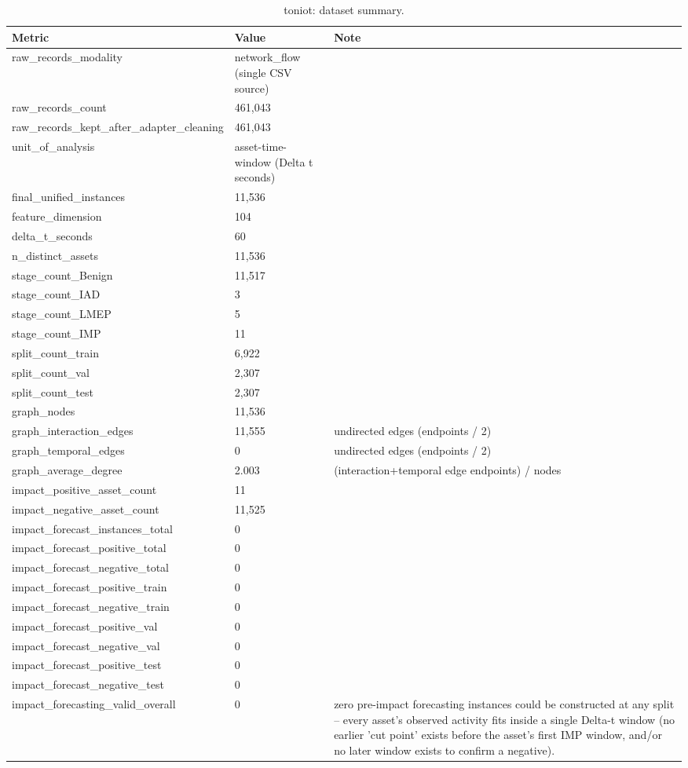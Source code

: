 \begin{table}[t]
\centering
\caption{toniot: dataset summary.}
\label{tab:toniot_dataset_summary}
\begin{tabular}{lll}
\toprule
Metric & Value & Note \\
\midrule
raw\_records\_modality & network\_flow (single CSV source) &  \\
raw\_records\_count & 461,043 &  \\
raw\_records\_kept\_after\_adapter\_cleaning & 461,043 &  \\
unit\_of\_analysis & asset-time-window (Delta t seconds) &  \\
final\_unified\_instances & 11,536 &  \\
feature\_dimension & 104 &  \\
delta\_t\_seconds & 60 &  \\
n\_distinct\_assets & 11,536 &  \\
stage\_count\_Benign & 11,517 &  \\
stage\_count\_IAD & 3 &  \\
stage\_count\_LMEP & 5 &  \\
stage\_count\_IMP & 11 &  \\
split\_count\_train & 6,922 &  \\
split\_count\_val & 2,307 &  \\
split\_count\_test & 2,307 &  \\
graph\_nodes & 11,536 &  \\
graph\_interaction\_edges & 11,555 & undirected edges (endpoints / 2) \\
graph\_temporal\_edges & 0 & undirected edges (endpoints / 2) \\
graph\_average\_degree & 2.003 & (interaction+temporal edge endpoints) / nodes \\
impact\_positive\_asset\_count & 11 &  \\
impact\_negative\_asset\_count & 11,525 &  \\
impact\_forecast\_instances\_total & 0 &  \\
impact\_forecast\_positive\_total & 0 &  \\
impact\_forecast\_negative\_total & 0 &  \\
impact\_forecast\_positive\_train & 0 &  \\
impact\_forecast\_negative\_train & 0 &  \\
impact\_forecast\_positive\_val & 0 &  \\
impact\_forecast\_negative\_val & 0 &  \\
impact\_forecast\_positive\_test & 0 &  \\
impact\_forecast\_negative\_test & 0 &  \\
impact\_forecasting\_valid\_overall & 0 & zero pre-impact forecasting instances could be constructed at any split -- every asset's observed activity fits inside a single Delta-t window (no earlier 'cut point' exists before the asset's first IMP window, and/or no later window exists to confirm a negative). \\
\bottomrule
\end{tabular}
\end{table}
